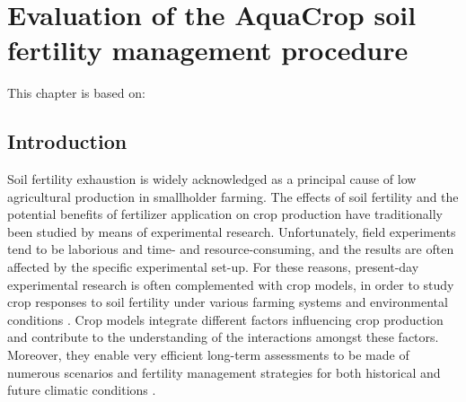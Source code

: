\chapter{Evaluation of the AquaCrop soil fertility management procedure}\label{ch:fertility}

This chapter is based on:\\

\section{Introduction}
Soil fertility exhaustion is widely acknowledged as a principal cause of low agricultural production in smallholder farming. The effects of soil fertility and the potential benefits of fertilizer application on crop production have traditionally been studied by means of experimental research. Unfortunately, field experiments tend to be laborious and time- and resource-consuming, and the results are often affected by the specific experimental set-up. For these reasons, present-day experimental research is often complemented with crop models, in order to study crop responses to soil fertility under various farming systems and environmental conditions \parencite{myers2005}. Crop models integrate different factors influencing crop production and contribute to the understanding of the interactions amongst these factors. Moreover, they enable very efficient long-term assessments to be made of numerous scenarios and fertility management strategies \parencite{boote1996,carberry2002} for both historical and future climatic conditions \parencite{tubiello2002}.

